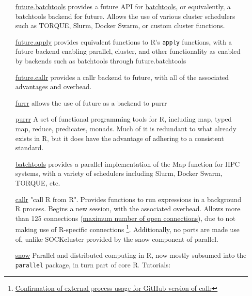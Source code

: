 \documentclass[a4paper, 11pt]{article}
\begin{document}
\begin{itemize}
\item[{\href{https://github.com/HenrikBengtsson/future.batchtools}{future.batchtools}}] provides a future API for \href{https://cran.r-project.org/web/packages/batchtools/index.html}{batchtools}, or
equivalently, a batchtools backend for future. Allows the use of
various cluster schedulers such as TORQUE, Slurm, Docker Swarm, or
custom cluster functions.
\item[{\href{https://github.com/HenrikBengtsson/future.apply}{future.apply}}] provides equivalent functions to R's \texttt{apply}
functions, with a future backend enabling parallel, cluster, and
other functionality as enabled by backends such as batchtools
through future.batchtools
\item[{\href{https://github.com/HenrikBengtsson/future.callr}{future.callr}}] provides a callr backend to future, with all of the
associated advantages and overhead.
\item[{\href{https://davisvaughan.github.io/furrr/}{furrr}}] allows the use of future as a backend to purrr
\item[{\href{https://purrr.tidyverse.org/}{purrr}}] A set of functional programming tools for R, including map,
typed map, reduce, predicates, monads. Much of it is redundant to
what already exists in R, but it does have the advantage of
adhering to a consistent standard.
\item[{\href{https://cran.r-project.org/web/packages/batchtools/index.html}{batchtools}}] provides a parallel implementation of the Map function
for HPC systems, with a variety of schedulers including Slurm,
Docker Swarm, TORQUE, etc.
\item[{\href{https://github.com/HenrikBengtsson/future.callr}{callr}}] "call R from R". Provides functions to run expressions in a
background R process. Begins a new session, with the
associated overhead. Allows more than 125 connections
(\href{https://github.com/HenrikBengtsson/Wishlist-for-R/issues/28}{maximum number of open connections}), due to not making use
of R-specific connections \footnote{\href{https://github.com/r-lib/processx/issues/91}{Confirmation of external process usage for GitHub version of callr}}. Additionally, no ports
are made use of, unlike SOCKcluster provided by the snow
component of parallel.
\item[{\href{https://cran.r-project.org/web/packages/snow/index.html}{snow}}] Parallel and distributed computing in R, now mostly subsumed
into the \texttt{parallel} package, in turn part of core R. Tutorials:
\begin{itemize}

\end{itemize}
\end{itemize}
\end{document}
